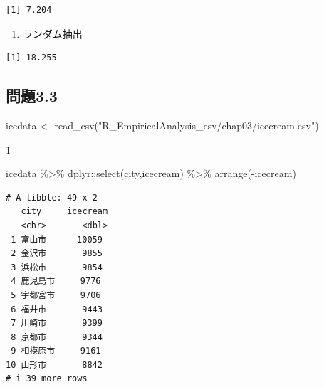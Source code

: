 \documentclass[
  letterpaper,
  DIV=11,
  numbers=noendperiod]{scrartcl}
\newenvironment{Shaded}{\begin{snugshade}}{\end{snugshade}}
\newcommand{\AttributeTok}[1]{\textcolor[rgb]{0.40,0.45,0.13}{#1}}
\newcommand{\DecValTok}[1]{\textcolor[rgb]{0.68,0.00,0.00}{#1}}
\newcommand{\FunctionTok}[1]{\textcolor[rgb]{0.28,0.35,0.67}{#1}}
\newcommand{\NormalTok}[1]{\textcolor[rgb]{0.00,0.23,0.31}{#1}}
\newcommand{\OtherTok}[1]{\textcolor[rgb]{0.00,0.23,0.31}{#1}}
\newcommand{\SpecialCharTok}[1]{\textcolor[rgb]{0.37,0.37,0.37}{#1}}
\newcommand{\StringTok}[1]{\textcolor[rgb]{0.13,0.47,0.30}{#1}}
\providecommand{\tightlist}{%
  \setlength{\itemsep}{0pt}\setlength{\parskip}{0pt}}\usepackage{longtable,booktabs,array}
\begin{document}
\begin{verbatim}
[1] 7.204
\end{verbatim}

\begin{enumerate}
\def\labelenumi{\arabic{enumi}.}
\setcounter{enumi}{2}
\tightlist
\item
  ランダム抽出
\end{enumerate}

\begin{Shaded}
\end{Shaded}

\begin{verbatim}
[1] 18.255
\end{verbatim}

\hypertarget{ux554fux984c3.3}{%
\subsection{問題3.3}\label{ux554fux984c3.3}}

\begin{Shaded}
\begin{Highlighting}[]
\NormalTok{icedata }\OtherTok{\textless{}{-}} \FunctionTok{read\_csv}\NormalTok{(}\StringTok{"R\_EmpiricalAnalysis\_csv/chap03/icecream.csv"}\NormalTok{)}
\end{Highlighting}
\end{Shaded}

1

\begin{Shaded}
\begin{Highlighting}[]
\NormalTok{icedata }\SpecialCharTok{\%\textgreater{}\%} 
\NormalTok{  dplyr}\SpecialCharTok{::}\FunctionTok{select}\NormalTok{(city,icecream) }\SpecialCharTok{\%\textgreater{}\%} 
  \FunctionTok{arrange}\NormalTok{(}\SpecialCharTok{{-}}\NormalTok{icecream)}
\end{Highlighting}
\end{Shaded}

\begin{verbatim}
# A tibble: 49 x 2
   city     icecream
   <chr>       <dbl>
 1 富山市      10059
 2 金沢市       9855
 3 浜松市       9854
 4 鹿児島市     9776
 5 宇都宮市     9706
 6 福井市       9443
 7 川崎市       9399
 8 京都市       9344
 9 相模原市     9161
10 山形市       8842
# i 39 more rows
\end{verbatim}
\end{document}
